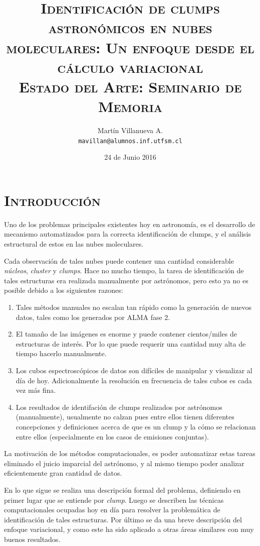 \documentclass[letter, 11pt]{article}
\title{\LARGE \textsc{Identificación de clumps astronómicos en nubes moleculares: Un enfoque desde el cálculo variacional} \\
    \large \textsc{Estado del Arte: Seminario de Memoria}}
\author{Martín Villanueva A. \\ \texttt{mavillan@alumnos.inf.utfsm.cl}}
\date{24 de Junio 2016}
\begin{document}
\clearpage\maketitle
\thispagestyle{empty}

\newpage






\section{\textsc{Introducción}}
Uno de los problemas principales  existentes hoy en astronomía, es el desarrollo de mecanismo automatizados para la correcta identificación de clumps, y el análisis estructural de estos en las nubes moleculares.

Cada observación de tales nubes puede contener una cantidad considerable \textit{núcleos}, \textit{cluster} y \textit{clumps}. Hace no mucho tiempo, la tarea de identificación de tales estructuras era realizada manualmente por astrónomos, pero esto ya no es posible debido a los siguientes razones:
\begin{enumerate}
    \item Tales métodos manuales no escalan tan rápido como la generación de nuevos datos, tales como los generados por ALMA fase 2.
    \item El tamaño de las imágenes es enorme y puede contener cientos/miles de estructuras de interés. Por lo que puede requerir una cantidad muy alta de tiempo hacerlo manualmente.
    \item Los cubos espectroscópicos de datos son difíciles de manipular y visualizar al día de hoy. Adicionalmente la resolución en frecuencia de tales cubos es cada vez más fina.
    \item Los resultados de identifación de clumps realizados por astrónomos (manualmente), usualmente no calzan pues entre ellos tienen diferentes concepciones y definiciones acerca de que es un clump y la cómo se relacionan entre ellos (especialmente en los casos de emisiones conjuntas).
\end{enumerate}

La motivación de los métodos computacionales, es poder automatizar estas tareas eliminado el juicio imparcial del astrónomo, y al mismo tiempo poder analizar eficientemente gran cantidad de datos.

En lo que sigue se realiza una descripción formal del problema, definiendo en primer lugar que se entiende por \textit{clump}. Luego se describen las técnicas computacionales ocupadas hoy en día para resolver la problemática de identificación de tales estructuras.  Por último se da una breve descripción del enfoque variacional, y como este ha sido aplicado a otras áreas similares con muy buenos resultados.
\end{document}
